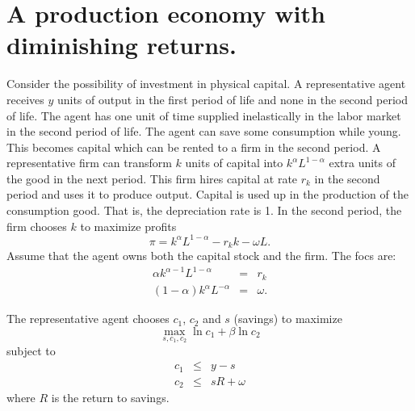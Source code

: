 \documentclass{sebase}
\begin{document}
\section{A production economy with diminishing returns.}

Consider the possibility of investment in physical capital. A representative
agent receives $y$ units of output in the first period of life and none in
the second period of life. The agent has one unit of time supplied
inelastically in the labor market in the second period of life. The agent
can save some consumption while young. This becomes capital which can be
rented to a firm in the second period. A representative firm can transform $%
k $ units of capital into $k^{\alpha }L^{1-\alpha }$ extra units of the good
in the next period. This firm hires capital at rate $r_{k}$ in the second
period and uses it to produce output. Capital is used up in the production
of the consumption good. That is, the depreciation rate is 1. In the second
period, the firm chooses $k$ to maximize profits%
\begin{equation*}
\pi =k^{\alpha }L^{1-\alpha }-r_{k}k-\omega L.
\end{equation*}%
Assume that the agent owns both the capital stock and the firm. The focs are:%
\begin{eqnarray*}
\alpha k^{\alpha -1}L^{1-\alpha } &=&r_{k} \\
\left( 1-\alpha \right) k^{\alpha }L^{-\alpha } &=&\omega .
\end{eqnarray*}%
\pagebreak

The representative agent chooses $c_{1}$, $c_{2}$ and $s$ (savings) to
maximize 
\begin{equation*}
\underset{s,c_{1},c_{2}}{\max }\ln c_{1}+\beta \ln c_{2}
\end{equation*}%
subject to 
\begin{eqnarray*}
c_{1} &\leq &y-s \\
c_{2} &\leq &sR+\omega
\end{eqnarray*}%
where $R$ is the return to savings.

\pagebreak
\end{document}
